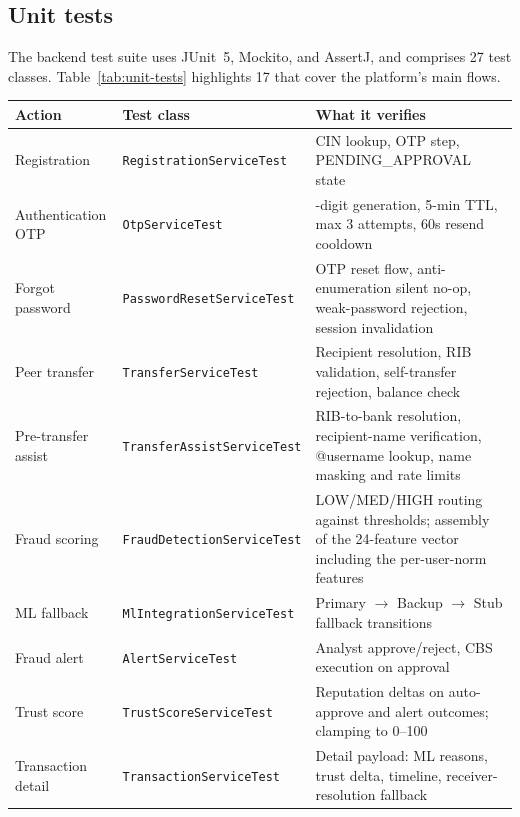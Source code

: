 \documentclass[12pt,a4paper]{report}
\begin{document}
\subsection{Unit tests}

The backend test suite uses JUnit~5, Mockito, and AssertJ, and comprises 27 test classes.
Table~\ref{tab:unit-tests} highlights 17 that cover the platform's main flows.

\begin{table}[H]
\centering
\footnotesize
\renewcommand{\arraystretch}{1.25}
\begin{tabularx}{\linewidth}{|>{\raggedright\arraybackslash}p{2.3cm}|>{\raggedright\arraybackslash}p{5.0cm}|>{\raggedright\arraybackslash}X|}
\hline
\textbf{Action} & \textbf{Test class} & \textbf{What it verifies} \\
\hline
Registration & \texttt{RegistrationServiceTest} & CIN lookup, OTP step, PENDING\_APPROVAL state \\
\hline
Authentication OTP & \texttt{OtpServiceTest} & 6-digit generation, 5-min TTL, max 3 attempts, 60s resend cooldown \\
\hline
Forgot password & \texttt{PasswordResetServiceTest} & OTP reset flow, anti-enumeration silent no-op, weak-password rejection, session invalidation \\
\hline
Peer transfer & \texttt{TransferServiceTest} & Recipient resolution, RIB validation, self-transfer rejection, balance check \\
\hline
Pre-transfer assist & \texttt{TransferAssistServiceTest} & RIB-to-bank resolution, recipient-name verification, @username lookup, name masking and rate limits \\
\hline
Fraud scoring & \texttt{FraudDetectionServiceTest} & LOW/MED/HIGH routing against thresholds; assembly of the 24-feature vector including the per-user-norm features \\
\hline
ML fallback & \texttt{MlIntegrationServiceTest} & Primary $\rightarrow$ Backup $\rightarrow$ Stub fallback transitions \\
\hline
Fraud alert & \texttt{AlertServiceTest} & Analyst approve/reject, CBS execution on approval \\
\hline
Trust score & \texttt{TrustScoreServiceTest} & Reputation deltas on auto-approve and alert outcomes; clamping to 0--100 \\
\hline
Transaction detail & \texttt{TransactionServiceTest} & Detail payload: ML reasons, trust delta, timeline, receiver-resolution fallback \\

\end{tabularx}
\end{table}
\end{document}
